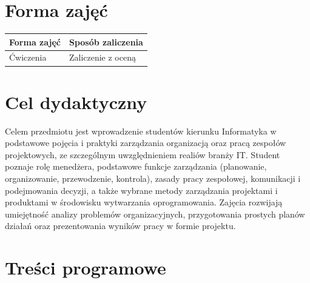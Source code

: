 \documentclass[12pt, a4paper]{article}
\begin{document}
\section{Forma zajęć}

\begin{tabular}{ll}
  \hline
  \textbf{Forma zajęć} & \textbf{Sposób zaliczenia} \\
  \hline
  Ćwiczenia & Zaliczenie z oceną \\
  \hline
\end{tabular}

\section{Cel dydaktyczny}

Celem przedmiotu jest wprowadzenie studentów kierunku Informatyka w podstawowe pojęcia i praktyki zarządzania organizacją oraz pracą zespołów projektowych, ze szczególnym uwzględnieniem realiów branży IT. Student poznaje rolę menedżera, podstawowe funkcje zarządzania (planowanie, organizowanie, przewodzenie, kontrola), zasady pracy zespołowej, komunikacji i podejmowania decyzji, a także wybrane metody zarządzania projektami i produktami w środowisku wytwarzania oprogramowania. Zajęcia rozwijają umiejętność analizy problemów organizacyjnych, przygotowania prostych planów działań oraz prezentowania wyników pracy w formie projektu.

\section{Treści programowe}
\end{document}

